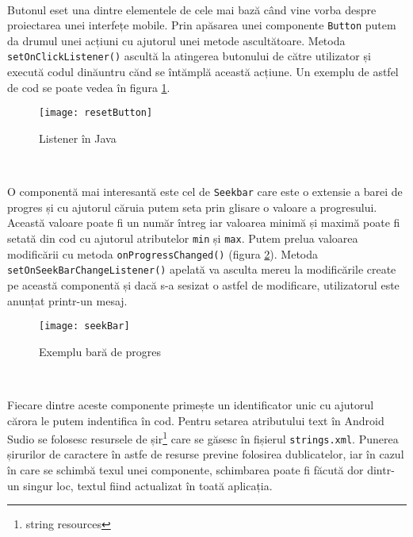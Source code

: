 \documentclass[../IoMusT.tex]{subfiles}
\begin{document}
\\
\par Butonul eset una dintre elementele de cele mai bază când vine vorba despre proiectarea unei interfețe mobile. Prin apăsarea unei componente \verb|Button| putem da drumul unei acțiuni cu ajutorul unei metode ascultătoare. Metoda \verb|setOnClickListener()| ascultă la atingerea butonului de către utilizator și execută codul dinăuntru cănd se întămplă această acțiune. Un exemplu de astfel de cod se poate vedea în figura \ref{fig:reset}.
\begin{figure}[h]
\centering
\texttt{[image: resetButton]}
\caption{Listener în Java}
\label{fig:reset}
\end{figure}
\\
\par O componentă mai interesantă este cel de \verb|Seekbar| care este o extensie a barei de progres și cu ajutorul căruia putem seta prin glisare o valoare a progresului. Această valoare poate fi un număr întreg iar valoarea minimă și maximă poate fi setată din cod cu ajutorul atributelor \verb|min| și \verb|max|. Putem prelua valoarea modificării cu metoda \verb|onProgressChanged()| (figura \ref{fig:seek}). Metoda \verb|setOnSeekBarChangeListener()| apelată va asculta mereu la modificările create pe această componentă și dacă s-a sesizat o astfel de modificare, utilizatorul este anunțat printr-un mesaj.
\begin{figure}[h]
\centering
\texttt{[image: seekBar]}
\caption{Exemplu bară de progres}
\label{fig:seek}
\end{figure}
\\
\par Fiecare dintre aceste componente primește un identificator unic cu ajutorul cărora le putem indentifica în cod. Pentru setarea atributului text în Android Sudio se folosesc resursele de șir\footnote{string resources} care se găsesc în fișierul \verb|strings.xml|. Punerea șirurilor de caractere în astfe de resurse previne folosirea dublicatelor, iar în cazul în care se schimbă texul unei componente, schimbarea poate fi făcută dor dintr-un singur loc, textul fiind actualizat în toată aplicația.
\end{document}
